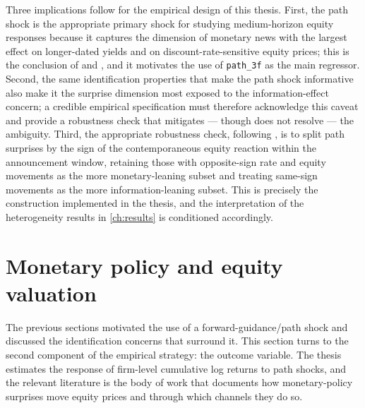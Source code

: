 Three implications follow for the empirical design of this thesis.
First, the path shock is the appropriate primary shock for studying
medium-horizon equity responses because it captures the dimension of
monetary news with the largest effect on longer-dated yields and on
discount-rate-sensitive equity prices; this is the conclusion of
\citet{gurkaynakSackSwanson2005} and \citet{swanson2021}, and it
motivates the use of \texttt{path\_3f} as the main regressor.
Second, the same identification properties that make the path shock
informative also make it the surprise dimension most exposed to the
information-effect concern; a credible empirical specification must
therefore acknowledge this caveat and provide a robustness check that
mitigates --- though does not resolve --- the ambiguity. Third, the
appropriate robustness check, following \citet{jarocinskiKaradi2020},
is to split path surprises by the sign of the contemporaneous equity
reaction within the announcement window, retaining those with
opposite-sign rate and equity movements as the more monetary-leaning
subset and treating same-sign movements as the more information-leaning
subset. This is precisely the construction implemented in the thesis,
and the interpretation of the heterogeneity results in
\cref{ch:results} is conditioned accordingly.

\section{Monetary policy and equity valuation}
\label{sec:literature-equity-valuation}

The previous sections motivated the use of a forward-guidance/path
shock and discussed the identification concerns that surround it. This
section turns to the second component of the empirical strategy: the
outcome variable. The thesis estimates the response of firm-level
cumulative log returns to path shocks, and the relevant literature is
the body of work that documents how monetary-policy surprises move
equity prices and through which channels they do so.


